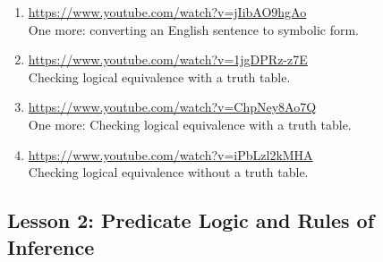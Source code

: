 \documentclass[11pt]{amsart}
\begin{document}
\begin{enumerate}
\item \url{https://www.youtube.com/watch?v=jIibAO9hgAo}\\
One more: converting an English sentence to symbolic form.\\[5pt]

\item \url{https://www.youtube.com/watch?v=1jgDPRz-z7E}\\
Checking logical equivalence with a truth table.\\[5pt]

\item \url{https://www.youtube.com/watch?v=ChpNey8Ao7Q}\\
One more: Checking logical equivalence with a truth table.\\[5pt]

\item \url{https://www.youtube.com/watch?v=iPbLzl2kMHA}\\
Checking logical equivalence without a truth table.\\[5pt]

\end{enumerate}

\subsection{Lesson 2: Predicate Logic and Rules of Inference}
\end{document}
